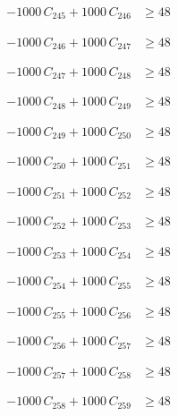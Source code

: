 \documentclass[a4paper,11pt]{article}
\begin{document}
\begin{align}
-1000\,C_{245} + 1000\,C_{246} &\geq 48 \nonumber
\end{align}

\begin{align}
-1000\,C_{246} + 1000\,C_{247} &\geq 48 \nonumber
\end{align}

\begin{align}
-1000\,C_{247} + 1000\,C_{248} &\geq 48 \nonumber
\end{align}

\begin{align}
-1000\,C_{248} + 1000\,C_{249} &\geq 48 \nonumber
\end{align}

\begin{align}
-1000\,C_{249} + 1000\,C_{250} &\geq 48 \nonumber
\end{align}

\begin{align}
-1000\,C_{250} + 1000\,C_{251} &\geq 48 \nonumber
\end{align}

\begin{align}
-1000\,C_{251} + 1000\,C_{252} &\geq 48 \nonumber
\end{align}

\begin{align}
-1000\,C_{252} + 1000\,C_{253} &\geq 48 \nonumber
\end{align}

\begin{align}
-1000\,C_{253} + 1000\,C_{254} &\geq 48 \nonumber
\end{align}

\begin{align}
-1000\,C_{254} + 1000\,C_{255} &\geq 48 \nonumber
\end{align}

\begin{align}
-1000\,C_{255} + 1000\,C_{256} &\geq 48 \nonumber
\end{align}

\begin{align}
-1000\,C_{256} + 1000\,C_{257} &\geq 48 \nonumber
\end{align}

\begin{align}
-1000\,C_{257} + 1000\,C_{258} &\geq 48 \nonumber
\end{align}

\begin{align}
-1000\,C_{258} + 1000\,C_{259} &\geq 48 \nonumber
\end{align}
\end{document}
